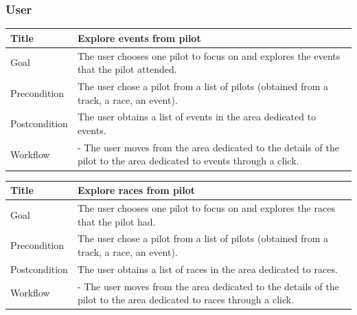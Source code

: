 \documentclass{beamer}
\begin{document}
\begin{frame}
    \frametitle{User}
    \begin{table}
        \tiny
        \begin{tabular}{|p{2cm}|p{6cm}|}
        \hline
        Title & \textbf{Explore events from pilot} \\
        \hline
        Goal & The user chooses one pilot to focus on and explores the events that the pilot attended. \\
        \hline
        Precondition & The user chose a pilot from a list of pilots (obtained from a track, a race, an event).\\
        \hline
        Postcondition & The user obtains a list of events in the area dedicated to events. \\
        \hline
        Workflow &
        - The user moves from the area dedicated to the details of the pilot to the
        area dedicated to events through a click. \\
        \hline
        \end{tabular}
\end{table}

\begin{table}
    \tiny
    \begin{tabular}{|p{2cm}|p{6cm}|}
    \hline
    Title & \textbf{Explore races from pilot} \\
    \hline
    Goal & The user chooses one pilot to focus on and explores the races that the pilot had. \\
    \hline
    Precondition & The user chose a pilot from a list of pilots (obtained from a track, a race, an event).\\
    \hline
    Postcondition & The user obtains a list of races in the area dedicated to races. \\
    \hline
    Workflow &
    - The user moves from the area dedicated to the details of the pilot to the
    area dedicated to races through a click. \\
    \hline
    \end{tabular}
\end{table}
\end{frame}



\end{document}

